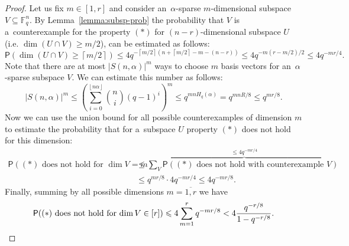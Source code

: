\documentclass[11pt]{article}
\newcommand{\rbr}[1]{\left(#1\right)}
\newcommand{\floorbr}[1]{\left\lfloor #1\right\rfloor}
\newcommand{\ceilbr}[1]{\left\lceil #1\right\rceil}
\let\le\leqslant
\let\ge\geqslant
\theoremstyle{plain}
\theoremstyle{definition}
\theoremstyle{remark}
\newcommand{\F}{\mathbb{F}}
\DeclareMathOperator{\rk}{rk}
\newcommand{\PP}{\mathsf{P}}
\begin{document}
\begin{proof}

    
    Let us fix $m\in[1,r]$ and consider an~$\alpha$-sparse $m$-dimensional subspace $V\subseteq \F_q^n$. %
    By Lemma~\ref{lemma:subsp-prob} the probability that $V$ is a~counterexample for the property $(*)$ for $(n-r)$-dimensional subspace $U$ (i.e. $\dim(U\cap V)\ge m/2$), can be estimated as follows:
    \[
    \PP(\dim(U\cap V)\ge \ceilbr{m/2})\le 4q^{-\ceilbr{m/2}(n+\ceilbr{m/2}-m-(n-r))}\le 4q^{-m(r-m/2)/2}\le 4q^{-mr/4}.
    \]
    Note that there are at most $|S(n,\alpha)|^m$ ways to choose $m$ basis vectors for an~$\alpha$-sparse subspace $V$. We can estimate this number as follows:
    $$|S(n,\alpha)|^m\le \rbr{\sum_{i=0}^{\floorbr{n\alpha}}\binom{n}{i}(q-1)^i}^m\le q^{mn H_q(\alpha)}=q^{mnR/8}\le q^{mr/8}.
    $$
    Now we can use the union bound for all possible counterexamples of dimension $m$ to estimate the probability that for a~subspace $U$ property $(*)$ does not hold for this dimension:
    \begin{align*}
    \PP((*)\mbox{ does not hold for $\dim V=m$})&\le \sum_{V}\overbrace{\PP((*)\mbox{ does not hold with counterexample }V)}^{\le 4q^{-mr/4}}\\
    &\le q^{mr/8}\cdot 4q^{-mr/4}\le 4q^{-mr/8}.
    \end{align*}
    Finally, summing by all possible dimensions $m=\overline{1,r}$ we have
    \[
    \PP((*)\mbox{ does not hold for $\dim V\in [r]$})\le 4\sum_{m=1}^rq^{-mr/8}< 4\frac{q^{-r/8}}{1-q^{-r/8}}.\qedhere
    \]
\end{proof}
\end{document}
